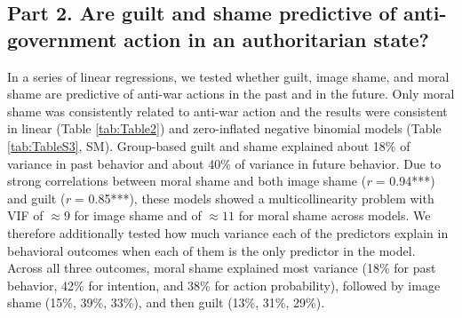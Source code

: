 \documentclass[
]{article}
\begin{document}
\subsection*{Part 2. Are guilt and shame predictive of anti-government action in an authoritarian state?}\label{part-2.-are-guilt-and-shame-predictive-of-anti-government-action-in-an-authoritarian-state}

In a series of linear regressions, we tested whether guilt, image shame, and moral shame are predictive of anti-war actions in the past and in the future. Only moral shame was consistently related to anti-war action and the results were consistent in linear (Table \ref{tab:Table2}) and zero-inflated negative binomial models (Table \ref{tab:TableS3}, SM). Group-based guilt and shame explained about 18\% of variance in past behavior and about 40\% of variance in future behavior. Due to strong correlations between moral shame and both image shame (\emph{r} = 0.94***) and guilt (\emph{r} = 0.85***), these models showed a multicollinearity problem with VIF of \(\approx 9\) for image shame and of \(\approx 11\) for moral shame across models. We therefore additionally tested how much variance each of the predictors explain in behavioral outcomes when each of them is the only predictor in the model. Across all three outcomes, moral shame explained most variance (18\% for past behavior, 42\% for intention, and 38\% for action probability), followed by image shame (15\%, 39\%, 33\%), and then guilt (13\%, 31\%, 29\%).
\end{document}
